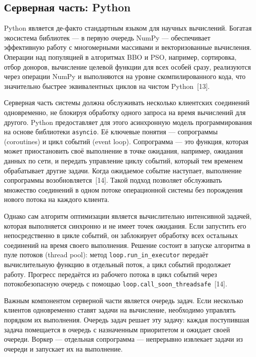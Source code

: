 \documentclass[14pt, russian]{scrartcl}
\begin{document}
\subsection{Серверная часть: Python}

Python является де-факто стандартным языком для научных вычислений.
Богатая экосистема библиотек --- в первую очередь NumPy --- обеспечивает
эффективную работу с многомерными массивами и векторизованные вычисления.
Операции над популяцией в алгоритмах BBO и PSO, например, сортировка, отбор
доноров, вычисление целевой функции для всех особей сразу, реализуются
через операции NumPy и выполняются на уровне скомпилированного кода,
что значительно быстрее эквивалентных циклов на чистом Python~[13].

Серверная часть системы должна обслуживать несколько клиентских
соединений одновременно, не блокируя обработку одного запроса на время
вычислений для другого. Python предоставляет для этого асинхронную
модель программирования на основе библиотеки \texttt{asyncio}. Её
ключевые понятия --- сопрограммы (coroutines) и цикл событий (event
loop). Сопрограмма --- это функция, которая может приостановить своё
выполнение в точке ожидания, например, ожидания данных по сети, и
передать управление циклу событий, который тем временем обрабатывает
другие задачи. Когда ожидаемое событие наступает, выполнение
сопрограммы возобновляется~[14]. Такой подход позволяет обслуживать
множество соединений в одном потоке операционной системы без
порождения нового потока на каждого клиента.

Однако сам алгоритм оптимизации является вычислительно интенсивной
задачей, которая выполняется синхронно и не имеет точек ожидания.
Если запустить его непосредственно в цикле событий, он заблокирует
обработку всех остальных соединений на время своего выполнения.
Решение состоит в запуске алгоритма в пуле потоков (thread pool):
метод \texttt{loop.run\_in\_executor} передаёт вычислительную функцию
в отдельный поток, а цикл событий продолжает работу. Прогресс передаётся
из рабочего потока в цикл событий через потокобезопасную очередь
с помощью \texttt{loop.call\_soon\_threadsafe}~[14].

Важным компонентом серверной части является очередь задач. Если несколько
клиентов одновременно ставят задачи на вычисление, необходимо управлять
порядком их выполнения. Очередь задач решает эту задачу: каждая
поступившая задача помещается в очередь с назначенным приоритетом и
ожидает своей очереди. Воркер --- отдельная сопрограмма --- непрерывно
извлекает задачи из очереди и запускает их на выполнение.
\end{document}
